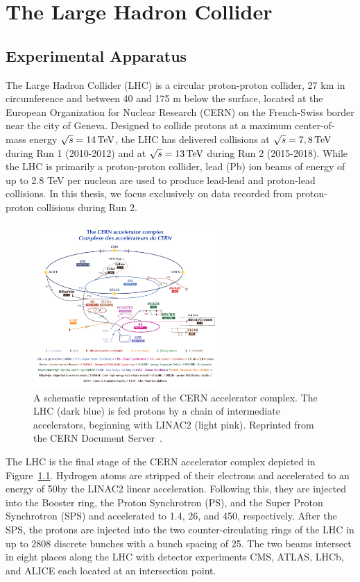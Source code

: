 \chapter{The Large Hadron Collider}

\section{Experimental Apparatus}

The Large Hadron Collider (LHC) is a circular proton-proton collider, 27 km in circumference and between 40 and 175 m below the surface, located at the European Organization for Nuclear Research (CERN) on the French-Swiss border near the city of Geneva.
Designed to collide protons at a maximum center-of-mass energy $\sqrt{s} = 14\,\text{Te\hspace{-.08em}V}$, the LHC has delivered collisions at $\sqrt{s} = 7, 8 \,\text{Te\hspace{-.08em}V}$ during Run 1 (2010-2012) and at $\sqrt{s} = 13\,\text{Te\hspace{-.08em}V}$ during Run 2 (2015-2018).
While the LHC is primarily a proton-proton collider, lead (Pb) ion beams of energy of up to 2.8 TeV per nucleon are used to produce lead-lead and proton-lead collisions.
In this thesis, we focus exclusively on data recorded from proton-proton collisions during Run 2.

\begin{figure}[htbp]
  \centering
  \includegraphics[width=0.625\textwidth]{Collider/Figures/LHC_diagram.pdf}
  \caption{
    A schematic representation of the CERN accelerator complex. 
    The LHC (dark blue) is fed protons by a chain of intermediate accelerators, beginning with LINAC2 (light pink).
    Reprinted from the CERN Document Server~\cite{}. %
  }
  \label{fig:lhc}
\end{figure}

The LHC is the final stage of the CERN accelerator complex depicted in Figure~\ref{fig:lhc}.
Hydrogen atoms are stripped of their electrons and accelerated to an energy of 50\GeV by the LINAC2 linear acceleration.
Following this, they are injected into the Booster ring, the Proton Synchrotron (PS), and the Super Proton Synchrotron (SPS) and accelerated to 1.4, 26, and 450\GeV, respectively.
After the SPS, the protons are injected into the two counter-circulating rings of the LHC in up to 2808 discrete bunches with a bunch spacing of 25\ns.
The two beams intersect in eight places along the LHC with detector experiments CMS, ATLAS, LHCb, and ALICE each located at an intersection point.

